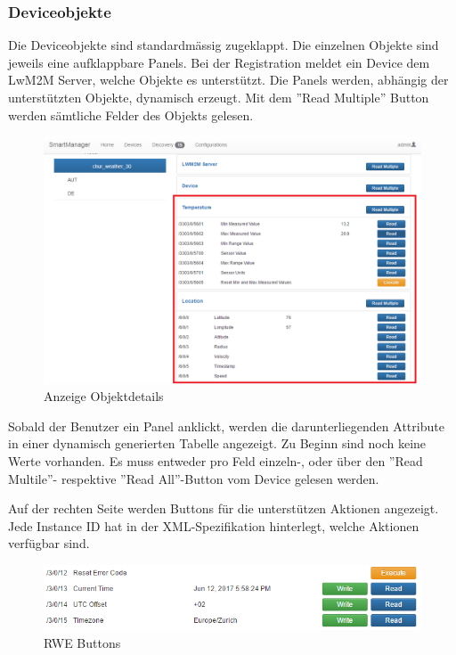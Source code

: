 \subsubsection{Deviceobjekte}
Die Deviceobjekte sind standardmässig zugeklappt. Die einzelnen Objekte sind jeweils eine aufklappbare Panels. Bei der Registration meldet ein Device dem LwM2M Server, welche Objekte es unterstützt. Die Panels werden, abhängig der unterstützten Objekte, dynamisch erzeugt. Mit dem ''Read Multiple'' Button werden sämtliche Felder des Objekts gelesen.

\begin{figure}[H]
\centering
\includegraphics[scale=0.57]{../04_Realisierung/images/userinterface/devicefragment.png}
\caption{Anzeige Objektdetails}
\end{figure}

Sobald der Benutzer ein Panel anklickt, werden die darunterliegenden Attribute in einer dynamisch generierten Tabelle angezeigt. Zu Beginn sind noch keine Werte vorhanden. Es muss entweder pro Feld einzeln-, oder über den ''Read Multile''- respektive ''Read All''-Button vom Device gelesen werden.

Auf der rechten Seite werden Buttons für die unterstützen Aktionen angezeigt. Jede Instance ID hat in der XML-Spezifikation hinterlegt, welche Aktionen verfügbar sind.

\begin{figure}[H]
\centering
\includegraphics[scale=0.7]{../04_Realisierung/images/userinterface/rwe.png}
\caption{RWE Buttons}
\end{figure}

